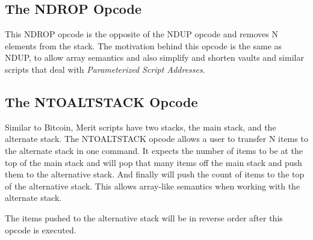 \documentclass{article}
\begin{document}
\subsection{The NDROP Opcode}

\begin{center}
\end{center}

This NDROP opcode is the opposite of the NDUP opcode and removes N elements from the stack.
The motivation behind this opcode is the same as NDUP, to allow array semantics and
also simplify and shorten vaults and similar scripts that deal with
\emph{Parameterized Script Addresses}.

\subsection{The NTOALTSTACK Opcode}

\begin{center}
\end{center}

Similar to Bitcoin, Merit scripts have two stacks, the main stack, and the alternate
stack.  The NTOALTSTACK opcode allows a user to transfer N items to the alternate stack
in one command.  It expects the number of items to be at the top of the main stack and
will pop that many items off the main stack and push them to the alternative stack.  And
finally will push the count of items to the top of the alternative stack.  This allows 
array-like semantics when working with the alternate stack.

The items pushed to the alternative stack will be in reverse order after this opcode is
executed.
\end{document}
